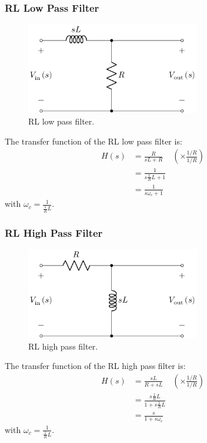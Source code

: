 \documentclass{article}
\begin{document}
\subsubsection{RL Low Pass Filter}
\begin{figure}[H]
    \centering
    \includegraphics[height = 4cm]{figures/rl_low_pass_filter.pdf}
    \caption{RL low pass filter.} %
\end{figure}
The transfer function of the RL low pass filter is:
\begin{align*}
    H\left( s \right) & = \frac{R}{sL + R}            & \left( \times \frac{1/R}{1/R} \right) \\
                      & = \frac{1}{s\frac{1}{R}L + 1}                                         \\
                      & = \frac{1}{s\omega_c + 1}
\end{align*}
with \(\omega_c = \frac{1}{\frac{1}{R}L}\).
\subsubsection{RL High Pass Filter}
\begin{figure}[H]
    \centering
    \includegraphics[height = 4cm]{figures/rl_high_pass_filter.pdf}
    \caption{RL high pass filter.} %
\end{figure}
The transfer function of the RL high pass filter is:
\begin{align*}
    H\left( s \right) & = \frac{sL}{R + sL}                       & \left( \times \frac{1/R}{1/R} \right) \\
                      & = \frac{s\frac{1}{R}L}{1 + s\frac{1}{R}L}                                         \\
                      & = \frac{s}{1 + s\omega_c}
\end{align*}
with \(\omega_c = \frac{1}{\frac{1}{R}L}\).
\end{document}
